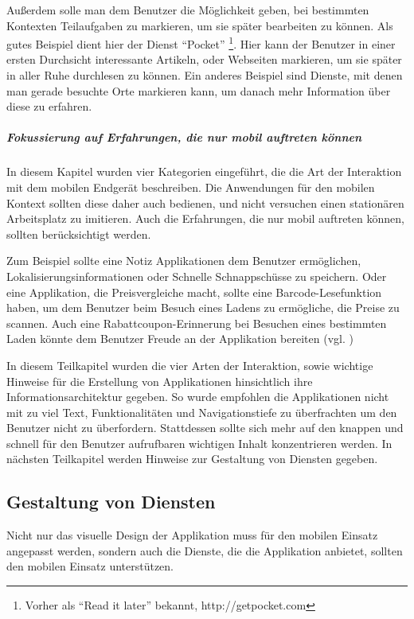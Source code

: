Außerdem solle man dem Benutzer die Möglichkeit geben, bei bestimmten Kontexten Teilaufgaben zu markieren, um sie später bearbeiten zu können. Als gutes Beispiel dient hier der Dienst “Pocket” \footnote{Vorher als “Read it later” bekannt, http://getpocket.com }. Hier kann der Benutzer in einer ersten Durchsicht interessante Artikeln, oder Webseiten markieren, um sie später in aller Ruhe durchlesen zu können. Ein anderes Beispiel sind Dienste, mit denen man gerade besuchte Orte markieren kann, um danach mehr Information über diese zu erfahren.

\subparagraph{Fokussierung auf Erfahrungen, die nur mobil auftreten können} %
\label{subp:fokussiere_auf_erfahrungen_die_nur_mobil_auftreten_k_nnen}

In diesem Kapitel wurden vier Kategorien eingeführt, die die Art der Interaktion mit dem mobilen Endgerät beschreiben. Die Anwendungen für den mobilen Kontext sollten diese daher auch bedienen, und nicht versuchen einen stationären Arbeitsplatz zu imitieren. Auch die Erfahrungen, die nur mobil auftreten können, sollten berücksichtigt werden. 

Zum Beispiel sollte eine Notiz Applikationen dem Benutzer ermöglichen, Lokalisierungsinformationen oder Schnelle Schnappschüsse zu speichern. Oder eine Applikation, die Preisvergleiche macht, sollte eine Barcode-Lesefunktion haben, um dem Benutzer beim Besuch eines Ladens zu ermögliche, die Preise zu scannen.  Auch eine Rabattcoupon-Erinnerung bei Besuchen eines bestimmten Laden könnte dem Benutzer Freude an der Applikation bereiten (vgl. \cite{smartOnline})
\newline

In diesem Teilkapitel wurden die vier Arten der Interaktion, sowie wichtige Hinweise für die Erstellung von Applikationen hinsichtlich ihre Informationsarchitektur gegeben. So wurde empfohlen die Applikationen nicht mit zu viel Text, Funktionalitäten und Navigationstiefe zu überfrachten um den Benutzer nicht zu überfordern. Stattdessen sollte sich mehr auf den knappen und schnell für den Benutzer aufrufbaren wichtigen Inhalt konzentrieren werden. 
In nächsten Teilkapitel werden Hinweise zur Gestaltung von Diensten gegeben.

\subsection{Gestaltung von Diensten}
\label{sub:gestaltung_von_diensten}

Nicht nur das visuelle Design der Applikation muss für den mobilen Einsatz angepasst werden, sondern auch die Dienste, die die Applikation anbietet, sollten den mobilen Einsatz unterstützen. 

